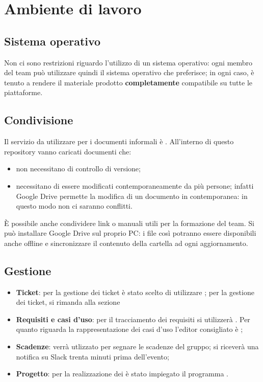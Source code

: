 \section{Ambiente di lavoro}
	\subsection{Sistema operativo}
	Non ci sono restrizioni riguardo l'utilizzo di un sistema operativo: ogni membro del team può utilizzare quindi il sistema operativo che preferisce; in ogni caso, è tenuto a rendere il materiale prodotto \textbf{completamente} compatibile su tutte le piattaforme.
	\subsection{Condivisione}
	Il servizio da utilizzare per i documenti informali è .
	All'interno di questo repository vanno caricati documenti che:
	\begin{itemize}
		\item non necessitano di controllo di versione;
		\item necessitano di essere modificati contemporaneamente da più persone; infatti Google Drive permette la modifica di un documento in contemporanea: in questo modo non ci saranno conflitti.
	\end{itemize}
	È possibile anche condividere link o manuali utili per la formazione del team. Si può installare Google Drive sul proprio PC: i file così potranno essere disponibili anche offline e sincronizzare il contenuto della cartella ad ogni aggiornamento.
	\subsection{Gestione}
		\begin{itemize}
			\item \textbf{Ticket}: per la gestione dei ticket è stato scelto di utilizzare ; per la gestione dei ticket, si rimanda alla sezione %
			\item \textbf{Requisiti e casi d'uso}: per il tracciamento dei requisiti si utilizzerà . Per quanto riguarda la rappresentazione dei casi d'uso l'editor consigliato è ; %
			\item \textbf{Scadenze}:  verrà utlizzato per segnare le scadenze del gruppo; si riceverà una notifica su Slack trenta minuti prima dell'evento;
			\item \textbf{Progetto}: per la realizzazione dei  è stato impiegato il programma .
		\end{itemize}
